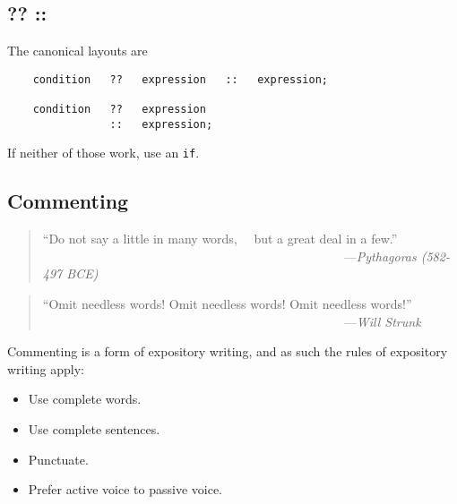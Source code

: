 \subsection{?? ::}

The canonical layouts are

\begin{verbatim}
    condition   ??   expression   ::   expression;

    condition   ??   expression 
                ::   expression;

\end{verbatim}

If neither of those work, use an {\tt if}.


\subsection{Commenting}

\begin{quote}\begin{tiny}
                   ``Do not say a little in many words,\newline
                   ~~but a great deal in a few.''\newline
               ~~~~~~~~~~~~~~~~~~~~~~~~~~~~~~~~~~~~~~~~~~~~~~~~---{\em Pythagoras (582-497 BCE)}
\end{tiny}\end{quote}

\begin{quote}\begin{tiny}
                   ``Omit needless words!  Omit needless words! Omit needless words!''\newline
               ~~~~~~~~~~~~~~~~~~~~~~~~~~~~~~~~~~~~~~~~~~~~~~~~---{\em Will Strunk}
\end{tiny}\end{quote}


Commenting is a form of expository writing, and as such 
the rules of expository writing apply: 

\begin{itemize}
\item Use complete words. 
\item Use complete sentences. 
\item Punctuate. 
\item Prefer active voice to passive voice. 
\end{itemize}

